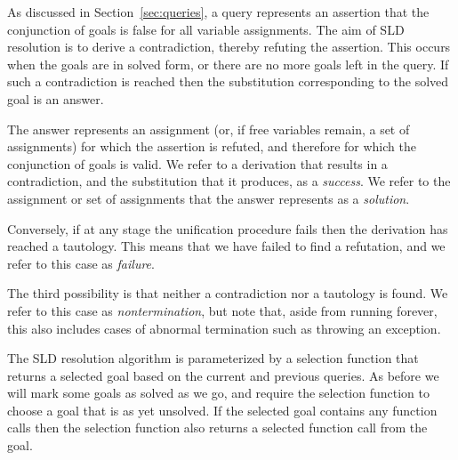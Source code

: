 As discussed in Section~\ref{sec:queries},
a query represents an assertion that
the conjunction of goals is false for all variable assignments.
The aim of SLD resolution is to derive a contradiction,
thereby refuting the assertion.
This occurs when the goals are in solved form,
or there are no more goals left in the query.
If such a contradiction is reached then
the substitution corresponding to the solved goal is an answer.

The answer represents an assignment
(or, if free variables remain, a set of assignments)
for which the assertion is refuted,
and therefore for which the conjunction of goals is valid.
We refer to a derivation that results in a contradiction,
and the substitution that it produces,
as a \emph{success\label{gi:success}}.
We refer to the assignment or set of assignments
that the answer\label{gi:answer2} represents
as a \emph{solution\label{gi:solution3}}.

Conversely,
if at any stage the unification procedure fails
then the derivation has reached a tautology.
This means that we have failed to find a refutation,
and we refer to this case as \emph{failure\label{gi:failure}}.

The third possibility is that
neither a contradiction nor a tautology is found.
We refer to this case as \emph{nontermination},
but note that, aside from running forever,
this also includes cases of
abnormal termination such as throwing an exception.

The SLD resolution algorithm is
parameterized by a selection function
that returns a selected goal
based on the current and previous queries.
As before we will mark some goals as solved as we go,
and require the selection function
to choose a goal that is as yet unsolved.
If the selected goal contains any function calls
then the selection function also returns
a selected function call from the goal.

